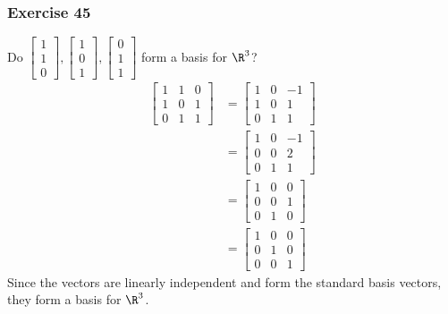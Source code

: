 \documentclass{math}
\begin{document}
\subsubsection*{Exercise 45}
Do \( \begin{bmatrix}1 \\ 1 \\ 0\end{bmatrix},\begin{bmatrix}1 \\ 0 \\ 1
\end{bmatrix},\begin{bmatrix}0 \\ 1 \\ 1\end{bmatrix} \) form a basis for
\( \R^3 \)?
\begin{align*}
  \begin{bmatrix}
    1 & 1 & 0 \\
    1 & 0 & 1 \\
    0 & 1 & 1
  \end{bmatrix} &= \begin{bmatrix}
    1 & 0 & -1 \\
    1 & 0 & 1 \\
    0 & 1 & 1
  \end{bmatrix} \\
  &= \begin{bmatrix}
    1 & 0 & -1 \\
    0 & 0 & 2 \\
    0 & 1 & 1
  \end{bmatrix} \\
  &= \begin{bmatrix}
    1 & 0 & 0 \\
    0 & 0 & 1 \\
    0 & 1 & 0
  \end{bmatrix} \\
  &= \begin{bmatrix}
    1 & 0 & 0 \\
    0 & 1 & 0 \\
    0 & 0 & 1
  \end{bmatrix}
\end{align*}
Since the vectors are linearly independent and form the standard basis vectors,
they form a basis for \( \R^3 \).
\end{document}
